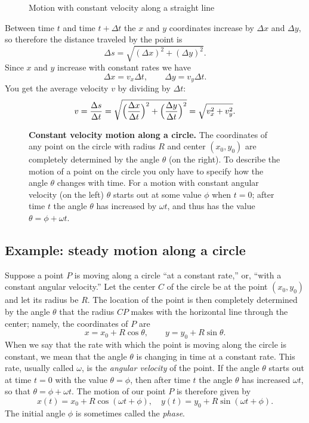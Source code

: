\begin{figure}[h]
  \sffamily\small%
  
  \caption{Motion with constant velocity along a straight line}
\end{figure}
Between time $t$ and time $t+\Delta t$ the $x$ and $y$ coordinates increase by
$\Delta x$ and $\Delta y$, so therefore the distance traveled by the point is
\begin{equation}
  \Delta s = \sqrt{(\Delta x)^2 + (\Delta y)^2}.
  \label{eq:05distance-travelled-along-line}
\end{equation}
Since $x$ and $y$ increase with constant rates we have
\[
\Delta x = v_x \Delta t, \qquad \Delta y = v_y \Delta t.
\]
You get the average velocity $v$ by dividing by $\Delta t$:
\begin{equation}
  v = \frac{\Delta s} {\Delta t}
  = \sqrt{\Bigl(\frac{\Delta x}{\Delta t}\Bigr)^2
    + \Bigl(\frac{\Delta y}{\Delta t}\Bigr)^2}
  =\sqrt{v_x^2 + v_y^2}.
  \label{eq:velocity-along-line}
\end{equation}


\begin{figure}[t]
  \small%
  
  \caption{\textbf{Constant velocity motion along a circle.}  The
    coordinates of any point on the circle with radius $R$ and center
    $(x_0,y_0)$ are completely determined by the angle $\theta$ (on
    the right).  To describe the motion of a point on the circle you
    only have to specify how the angle $\theta$ changes with time.
    For a motion with constant angular velocity (on the left) $\theta$
    starts out at some value $\phi$ when $t=0$; after time $t$ the
    angle $\theta$ has increased by $\omega t$, and thus has the value
    $\theta = \phi+\omega t$. }
\end{figure}
\subsection{Example: steady motion along a circle}
Suppose a point $P$ is moving along a circle ``at a constant rate,''
or, ``with a constant angular velocity.''  Let the center $C$ of the
circle be at the point $(x_0, y_0)$ and let its radius be $R$.  The
location of the point is then completely determined by the angle
$\theta$ that the radius $CP$ makes with the horizontal line through
the center; namely, the coordinates of $P$ are
\[
x = x_0 + R\cos \theta, \qquad y=y_0+R\sin \theta.
\]
When we say that the rate with which the point is moving along the circle is
constant, we mean that the angle $\theta$ is changing in time at a constant
rate.  This rate, usually called $\omega$, is the \emph{angular velocity} of the
point.  If the angle $\theta$ starts out at time $t=0$ with the value
$\theta=\phi$, then after time $t$ the angle $\theta$ has increased $\omega t$,
so that $\theta = \phi+\omega t$.  The motion of our point $P$ is therefore
given by
\begin{equation}
  x(t) = x_0 + R\cos (\omega t + \phi), \quad 
  y(t) = y_0 + R\sin (\omega t + \phi).
  \label{eq:05motion-on-circle}
\end{equation}
The initial angle $\phi$ is sometimes called the \emph{phase}.

